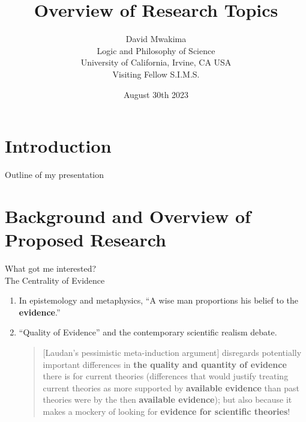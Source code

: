 \documentclass{beamer}
\title{Overview of Research Topics}
\author{David Mwakima \\
		Logic and Philosophy of Science\\
		University of California, Irvine, CA USA\\
		Visiting Fellow S.I.M.S.}
\date{August 30th 2023}
\begin{document}
\begin{frame}
\maketitle
\end{frame}

\section{Introduction}

 \begin{frame}{Outline of my presentation}
        \tableofcontents
    \end{frame}
    
\section{Background and Overview of Proposed Research}

\begin{frame}{What got me interested? \\ The Centrality of Evidence}
        \begin{enumerate}
        \item In epistemology and metaphysics, ``A wise man proportions his belief to the \textbf{evidence}.'' \citet{Hume1748}
        \vfill
        \item ``Quality of Evidence'' and the contemporary scientific realism debate.
\vfill
\begin{quote}
              
[Laudan's pessimistic meta-induction argument] disregards potentially important differences in \textbf{the quality and quantity of evidence} there is for current theories (differences that would justify treating current theories as more supported by \textbf{available evidence} than past theories were by the then \textbf{available evidence}); but also because it makes a mockery of looking for \textbf{evidence for scientific theories}! 

\citet{Psillos2018}
\end{quote}

\end{enumerate}

\end{frame}
\end{document}
